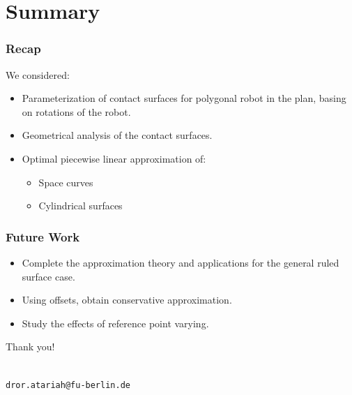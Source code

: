\documentclass[ucs,9pt,pagenumbersfull]{beamer}
\begin{document}
\section{Summary}

\begin{frame}
  \frametitle{Recap}
  We considered:
  \begin{itemize}
  \item Parameterization of contact surfaces for polygonal robot in
    the plan, basing on rotations of the robot.
  \item Geometrical analysis of the contact surfaces.
  \item Optimal piecewise linear approximation of:
    \begin{itemize}
    \item Space curves
    \item Cylindrical surfaces
    \end{itemize}
  \end{itemize}
\end{frame}

\begin{frame}
  \frametitle{Future Work}
  \begin{itemize}
  \item Complete the approximation theory and applications for the
    general ruled surface case.
  \item Using offsets, obtain conservative approximation.
  \item Study the effects of reference point varying.
  \end{itemize}
\end{frame}


 \appendix
% 
% 

\begin{frame}
	\begin{center}
	\begin{Huge}Thank you! \end{Huge}\\
	\texttt{dror.atariah@fu-berlin.de}
	\end{center}
\end{frame}
\end{document}
